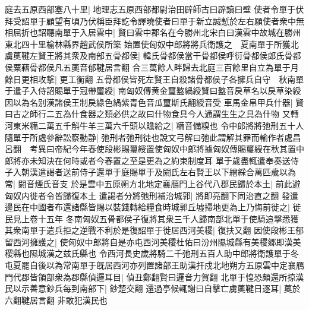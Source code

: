 庭去五原西部塞八十里|{
	地理志五原西部都尉治田辟師古曰辟讀曰壁}
使者令單于伏拜受詔單于顧望有頃乃伏稱臣拜訖令譯曉使者曰單于新立誠慙於左右願使者衆中無相屈折也詔聽南單于入居雲中|{
	賢曰雲中郡名在今勝州北宋白曰漢雲中故城在勝州東北四十里榆林縣界趙武侯所築}
始置使匈奴中郎將將兵衛護之　夏南單于所獲北虜薁鞬左賢王將其衆及南部五骨都侯|{
	韓氏骨都侯當干骨都侯呼衍骨都侯郎氏骨都侯粟藉骨都侯凡五薁音郁鞬居言翻}
合三萬餘人畔歸去北庭三百餘里自立為單于月餘日更相攻撃|{
	更工衡翻}
五骨都侯皆死左賢王自殺諸骨都侯子各擁兵自守　秋南單于遣子入侍詔賜單于冠帶璽綬|{
	南匈奴傳黄金璽盭緺綬賢曰盭音戾草名以戾草染綬因以為名别漢諸侯王制戾綠色緺紫青色音瓜璽斯氏翻綬音受}
車馬金帛甲兵什器|{
	賢曰古之師行二五為什食器之類必供之故曰什物食具今人通謂生生之具為什物}
又轉河東米糒二萬五千斛牛羊三萬六千頭以贍給之|{
	糒音備糗也}
令中郎將將弛刑五十人隨單于所處參辭訟察動静|{
	弛刑者弛刑徒也說文弓解曰弛此謂解其罪而輸作者處昌呂翻　考異曰帝紀今年春使段彬賜璽綬置使匈奴中郎將據匈奴傳賜璽綬在秋其置中郎將亦未知決在何時或者今春置之至是更為之約束制度耳}
單于歲盡輒遣奉奏送侍子入朝漢遣謁者送前侍子還單于庭賜單于及閼氏左右賢王以下繒綵合萬匹歲以為常|{
	閼音煙氏音支}
於是雲中五原朔方北地定襄鴈門上谷代八郡民歸於本土|{
	前此避匈奴内徙者令皆歸復本土}
遣謁者分將弛刑補治城郭|{
	將即亮翻下同治直之翻}
發遣邊民在中國者布還諸縣皆賜以裝錢轉給糧食時城郭丘墟掃地更為上乃悔前徙之|{
	徙民見上卷十五年}
冬南匈奴五骨都侯子復將其衆三千人歸南部北單于使騎追撃悉獲其衆南單于遣兵拒之逆戰不利於是復詔單于徙居西河美稷|{
	復扶又翻}
因使段彬王郁留西河擁護之|{
	使匈奴中郎將自是亦屯西河美稷杜佑曰汾州隰城縣有美稷郷即漢美稷縣也隰城漢之兹氏縣也}
令西河長史歲將騎二千弛刑五百人助中郎將衛護單于冬屯夏罷自後以為常南單于旣居西河亦列置諸部王助漢扞戍北地朔方五原雲中定襄鴈門代郡皆領部衆為郡縣偵邏耳目|{
	偵丑鄭翻賢曰邏音力賀翻}
北單于惶恐頗還所掠漢民以示善意鈔兵每到南部下|{
	鈔楚交翻}
還過亭候輒謝曰自擊亡虜薁鞬日逐耳|{
	薁於六翻鞬居言翻}
非敢犯漢民也

